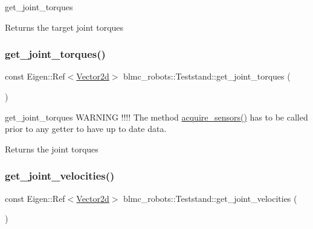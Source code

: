 get\+\_\+joint\+\_\+torques 

\begin{DoxyReturn}{Returns}
the target joint torques 
\end{DoxyReturn}
\mbox{\label{classblmc__robots_1_1Teststand_ae21ac86534e5ee7f15068f94957ba826}} 
\subsubsection{\texorpdfstring{get\+\_\+joint\+\_\+torques()}{get\_joint\_torques()}}
{\footnotesize\ttfamily const Eigen\+::\+Ref$<$\hyperlink{common__header_8hpp_acb6916bc8c9fe9d98c484fd4cc201447}{Vector2d}$>$ blmc\+\_\+robots\+::\+Teststand\+::get\+\_\+joint\+\_\+torques (\begin{DoxyParamCaption}{ }\end{DoxyParamCaption})\hspace{0.3cm}{\ttfamily [inline]}}



get\+\_\+joint\+\_\+torques W\+A\+R\+N\+I\+NG !!!! The method \hyperlink{classblmc__robots_1_1Teststand_a4203e25148ab5b4ddfef3b46647213c6}{acquire\+\_\+sensors()} has to be called prior to any getter to have up to date data. 

\begin{DoxyReturn}{Returns}
the joint torques 
\end{DoxyReturn}
\mbox{\label{classblmc__robots_1_1Teststand_acd1b325c6039fffbd40198f6deb9542c}} 
\subsubsection{\texorpdfstring{get\+\_\+joint\+\_\+velocities()}{get\_joint\_velocities()}}
{\footnotesize\ttfamily const Eigen\+::\+Ref$<$\hyperlink{common__header_8hpp_acb6916bc8c9fe9d98c484fd4cc201447}{Vector2d}$>$ blmc\+\_\+robots\+::\+Teststand\+::get\+\_\+joint\+\_\+velocities (\begin{DoxyParamCaption}{ }\end{DoxyParamCaption})\hspace{0.3cm}{\ttfamily [inline]}}



